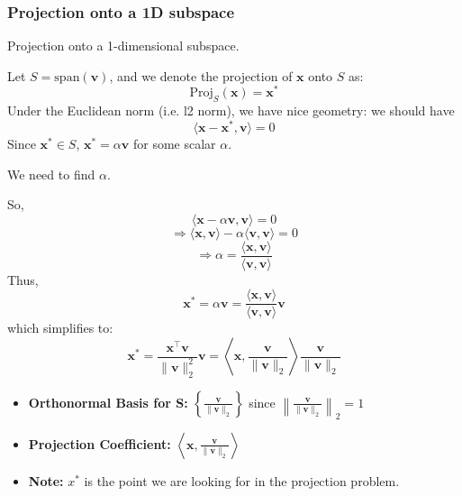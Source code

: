     \subsubsection{Projection onto a 1D subspace}
        \begin{derivation}
            Projection onto a 1-dimensional subspace.

            Let \( S = \text{span}(\mathbf{v}) \), and we denote the projection of \( \mathbf{x} \) onto \( S \) as:
            \[
            \text{Proj}_S(\mathbf{x}) = \mathbf{x}^*
            \]
            Under the Euclidean norm (i.e. l2 norm), we have nice geometry: we should have
            \[
            \langle \mathbf{x} - \mathbf{x}^*, \mathbf{v} \rangle = 0
            \]
            Since \( \mathbf{x}^* \in S \), \( \mathbf{x}^* = \alpha \mathbf{v} \) for some scalar \( \alpha \).

            We need to find \( \alpha \).

            So,
            \[
            \langle \mathbf{x} - \alpha \mathbf{v}, \mathbf{v} \rangle = 0
            \]
            \[
            \Rightarrow \langle \mathbf{x}, \mathbf{v} \rangle - \alpha \langle \mathbf{v}, \mathbf{v} \rangle = 0
            \]
            \[
            \Rightarrow \alpha = \frac{\langle \mathbf{x}, \mathbf{v} \rangle}{\langle \mathbf{v}, \mathbf{v} \rangle}
            \]
            Thus, 
            \[
            \mathbf{x}^* = \alpha \mathbf{v} = \frac{\langle \mathbf{x}, \mathbf{v} \rangle}{\langle \mathbf{v}, \mathbf{v} \rangle} \mathbf{v}
            \]
            which simplifies to:
            \[
            \mathbf{x}^* = \frac{\mathbf{x}^\top \mathbf{v}}{\|\mathbf{v}\|_2^2} \mathbf{v} = \left\langle \mathbf{x}, \frac{\mathbf{v}}{\|\mathbf{v}\|_2} \right\rangle \frac{\mathbf{v}}{\|\mathbf{v}\|_2}
            \]
            \begin{itemize}
                \item \textbf{Orthonormal Basis for S:} \( \left\{ \frac{\mathbf{v}}{\|\mathbf{v}\|_2} \right\} \) since \( \left\lVert \frac{\mathbf{v}}{\|\mathbf{v}\|_2} \right\rVert_2 = 1 \)
                \item \textbf{Projection Coefficient:} $\left\langle \mathbf{x}, \frac{\mathbf{v}}{\|\mathbf{v}\|_2} \right\rangle$
                \item \textbf{Note:} $x^*$ is the point we are looking for in the projection problem.
            \end{itemize}
        \end{derivation}

